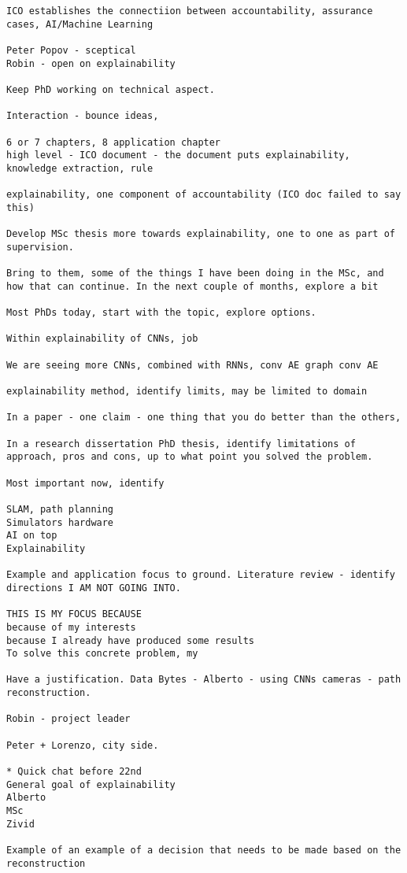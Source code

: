 \begin{verbatim}
ICO establishes the connectiion between accountability, assurance cases, AI/Machine Learning

Peter Popov - sceptical
Robin - open on explainability

Keep PhD working on technical aspect.

Interaction - bounce ideas,

6 or 7 chapters, 8 application chapter
high level - ICO document - the document puts explainability, knowledge extraction, rule

explainability, one component of accountability (ICO doc failed to say this)

Develop MSc thesis more towards explainability, one to one as part of supervision.

Bring to them, some of the things I have been doing in the MSc, and how that can continue. In the next couple of months, explore a bit

Most PhDs today, start with the topic, explore options.

Within explainability of CNNs, job

We are seeing more CNNs, combined with RNNs, conv AE graph conv AE

explainability method, identify limits, may be limited to domain

In a paper - one claim - one thing that you do better than the others,

In a research dissertation PhD thesis, identify limitations of approach, pros and cons, up to what point you solved the problem.

Most important now, identify

SLAM, path planning
Simulators hardware
AI on top
Explainability

Example and application focus to ground. Literature review - identify directions I AM NOT GOING INTO.

THIS IS MY FOCUS BECAUSE
because of my interests
because I already have produced some results
To solve this concrete problem, my

Have a justification. Data Bytes - Alberto - using CNNs cameras - path reconstruction.

Robin - project leader

Peter + Lorenzo, city side.

* Quick chat before 22nd
General goal of explainability
Alberto
MSc
Zivid

Example of an example of a decision that needs to be made based on the reconstruction


\end{verbatim}
